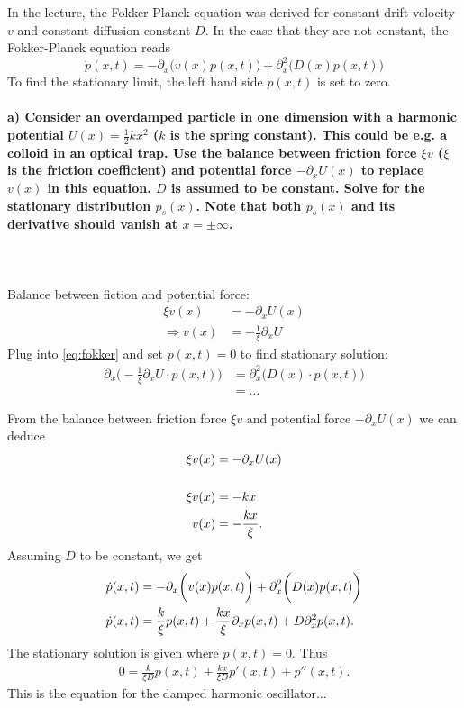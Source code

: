 In the lecture, the Fokker-Planck equation was derived for constant 
drift velocity $v$ and constant diffusion constant $D$. In the case 
that they are not constant, the Fokker-Planck equation reads
\begin{equation}
    \dot{p}(x,t)=-\partial_x\bigg(v(x)p(x,t)\bigg)+
    \partial_x^2\bigg(D(x)p(x,t)\bigg)
    \label{eq:fokker}
\end{equation}
To find the stationary limit, the left hand side $\dot p(x,t)$ is set 
to zero.

\paragraph{a) Consider an overdamped particle in one dimension with a 
    harmonic potential $U(x)=\frac{1}{2}kx^2$ ($k$ is the spring 
    constant). This could be e.g. a colloid in an optical trap. Use the 
    balance between friction force $\xi v$ ($\xi$ is the friction
    coefficient) and potential force $-\partial_xU(x)$ to replace 
    $v(x)$ in this equation. $D$ is assumed to be constant. Solve for 
    the stationary distribution $p_s(x)$. Note that both $p_s(x)$ and 
    its derivative should vanish at $x=\pm\infty$.
} \ \\
\\
    Balance between fiction and potential force:
    \begin{align}
        \xi v(x)
        &=-\partial_x U(x) \\
        \Rightarrow v(x)&=-\frac{1}{\xi}\partial_x U
    \end{align}
    Plug into \autoref{eq:fokker} and set $\dot p(x,t)=0$ to find 
    stationary solution:
    \begin{align}
        \partial_x\bigg(-\frac{1}{\xi}\partial_x U\cdot p(x,t)\bigg)
        &=\partial_x^2\bigg(D(x)\cdot p(x,t)\bigg) \\
        &=...
    \end{align}

From the balance between friction force $\xi v$ and potential force $-\partial_xU(x)$
we can deduce
\begin{align}
\xi v(x) &= -\partial_xU(x) \notag \\\\
\xi v(x) &= -kx \notag \\
v(x) &= - \frac{kx}{\xi}.
\end{align}
Assuming $D$ to be constant, we get
\begin{align}
	\dot{p}(x,t)&=-\partial_x\bigg(v(x)p(x,t)\bigg)+
    \partial_x^2\bigg(D(x)p(x,t)\bigg) \notag \\
    \dot{p}(x,t)&=\frac{k}{\xi} p(x,t) + \frac{kx}{\xi} \partial_x p(x,t) +
    D \partial_x^2 p(x,t) .
\end{align}
The stationary solution is given where $\dot{p}(x,t) = 0$. Thus
\begin{align}
	0 = \frac{k}{\xi D} p(x,t) + \frac{kx}{\xi D} p'(x,t) + p''(x,t).
\end{align}
This is the equation for the damped harmonic oscillator...


